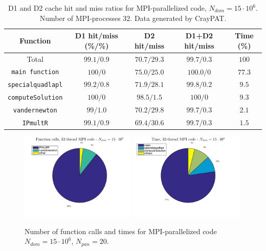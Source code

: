 \documentclass[a4paper,10pt]{article}
\def\code#1{\texttt{#1}}
\begin{document}
\begin{table}[ht]
\begin{center}
    \begin{tabular}{ c | c | c | c | c }
        Function & D1 hit/miss (\%/\%) & D2 hit/miss & D1+D2 hit/miss & Time (\%) \\ \hline
        Total & $99.1/0.9$ & $70.7/29.3$ & $99.7/0.3$ & $100$ \\ 
        \code{main function} & $100/0$ & $75.0/25.0$ & $100.0/0$ & $77.3$ \\
        \code{specialquadlapl} & $99.2/0.8$ & $71.9/28.1$ & $99.8/0.2$ & $9.5$ \\
        \code{computeSolution} & $100/0$ & $98.5/1.5$ & $100/0$ & $9.3$ \\
        \code{vandernewton} & $99/1.0$ & $70.2/29.8$ & $99.7/0.3$ & $2.1$ \\
        \code{IPmultR} & $99.1/0.9$ & $69.4/30.6$ & $99.7/0.3$ & $1.5$
    \end{tabular}
    \caption{D1 and D2 cache hit and miss ratios for MPI-parallelized code, $N_{dom} = 15\cdot10^6$. Number of MPI-processes $32$. Data generated by CrayPAT.}
    \label{tab:mpi_caches}
\end{center}
\end{table} 
\begin{figure}[ht]
    \begin{center}
        \includegraphics[width=0.49\textwidth]{Graphics/craypat_mpi_threads32_calls_pie.png}
        \includegraphics[width=0.49\textwidth]{Graphics/craypat_mpi_threads32_time_pie.png}
    \end{center}
    \caption{Number of function calls and times for MPI-parallelized code $N_{dom} = 15\cdot10^6$, $N_{pan} = 20$.}
    \label{fig:mpi_pie}
\end{figure}
\end{document}
